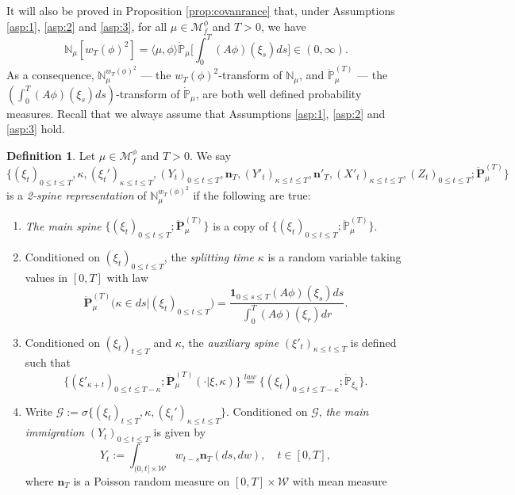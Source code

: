 \documentclass[UTF8]{pkuthss}
\theoremstyle{plain}
\theoremstyle{definition}
\newtheorem{defi}[thm]{Definition}
\numberwithin{equation}{section}
\begin{document}
It will also be proved in Proposition \ref{prop:covanrance} that, under Assumptions \ref{asp:1}, \ref{asp:2} and \ref{asp:3}, for all $\mu \in \mathcal M_f^\phi$ and $T>0$, we have
\[
	\mathbb N_\mu[w_T(\phi)^2]
	= \langle\mu, \phi\rangle \dot{\mathbb P}_{\mu} \Big[ \int_0^T (A\phi)(\xi_s) ds\Big]\in (0,\infty).
\]
	As a consequence, $\mathbb N_\mu^{w_T(\phi)^2}$ --- the $w_T(\phi)^2$-transform of $\mathbb N_\mu$, and $\ddot{\mathbb P}^{(T)}_\mu$ --- the $(\int_0^T (A\phi)(\xi_s) ds)$-transform of $\dot{\mathbb P}_{\mu}$,  are both well defined probability measures.
Recall that we always assume that Assumptions \ref{asp:1}, \ref{asp:2} and \ref{asp:3} hold.
\begin{defi}
	Let $\mu \in \mathcal M_f^\phi$ and $T>0$.
	We say
\[
	\{(\xi_t)_{0\leq t\leq T}, \kappa, (\xi_t')_{\kappa\leq t\leq T}, (Y_t)_{0\leq t\leq T}, \mathbf n_T,(Y'_t)_{\kappa \leq t\leq T}, \mathbf n'_T, (
	X'_t)_{\kappa \leq t\leq T}, (Z_t)_{0\leq t\leq T} ; \ddot {\mathbf P}_\mu^{(T)}\}
\]
	is a \emph{2-spine representation} of $\mathbb N_\mu^{w_T(\phi)^2}$ if the following are true:
\begin{enumerate}
\item
	\emph{The main spine} $\{(\xi_t)_{0\leq t\leq T}; \ddot{\mathbf P}_\mu^{(T)}\}$ is a copy of $\{(\xi_t)_{0\leq t\leq T}; \ddot{\mathbb P}_{\mu}^{(T)}\}$.
\item
	Conditioned on $(\xi_t)_{0\leq t \leq T}$, the \emph{splitting time} $\kappa$ is a random variable taking values in $[0,T]$ with law
\[
	\ddot{\mathbf P}_\mu^{(T)}\big(\kappa \in ds\big|(\xi_t)_{0\leq t\leq T}\big)
	=\frac {\mathbf 1_{0\leq s\leq T} (A\phi)(\xi_s) ds} {\int_0^T (A\phi)(\xi_r) dr}.
\]
\item
	Conditioned on $(\xi_t)_{t \leq T}$ and $\kappa$, the \emph{auxiliary spine} $(\xi'_t)_{\kappa \leq t \leq T}$ is defined such that
\begin{equation}\label{eq:defAuxilSpin}
	\{(\xi'_{\kappa+t})_{0 \leq t \leq T - \kappa}; \ddot{\mathbf P}_\mu^{(T)}(\cdot | \xi,\kappa) \}
	\overset{law}{=} \{(\xi_t)_{0 \leq t \leq T - \kappa}; \dot{\mathbb P}_{\xi_\kappa} \}.
\end{equation}
\item
	Write $\mathscr G
	:= \sigma \{ (\xi_t)_{t \leq T}, \kappa, (\xi_t')_{\kappa \leq t \leq T} \}$.
	Conditioned on $\mathscr G$, \emph{the main immigration} $(Y_t)_{0 \leq t\leq T}$ is given by
\[
	Y_t
	:= \int_{(0,t] \times \mathcal W} w_{t-s} \mathbf n_T(ds, dw),
	\quad t\in [0,T],
\]
	where $\mathbf n_T$ is a
	Poisson random measure on $[0,T] \times \mathcal W$ with mean measure

\end{enumerate}
\end{defi}
\end{document}
